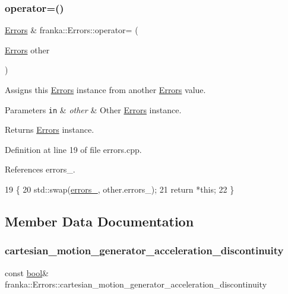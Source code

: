 \subsubsection{\texorpdfstring{operator=()}{operator=()}}
{\footnotesize\ttfamily \hyperlink{structfranka_1_1Errors}{Errors} \& franka\+::\+Errors\+::operator= (\begin{DoxyParamCaption}\item[{\hyperlink{structfranka_1_1Errors}{Errors}}]{other }\end{DoxyParamCaption})}

Assigns this \hyperlink{structfranka_1_1Errors}{Errors} instance from another \hyperlink{structfranka_1_1Errors}{Errors} value.


\begin{DoxyParams}[1]{Parameters}
\mbox{\tt in}  & {\em other} & Other \hyperlink{structfranka_1_1Errors}{Errors} instance.\\
\hline
\end{DoxyParams}
\begin{DoxyReturn}{Returns}
\hyperlink{structfranka_1_1Errors}{Errors} instance. 
\end{DoxyReturn}


Definition at line 19 of file errors.\+cpp.



References errors\+\_\+.


\begin{DoxyCode}
19                                       \{
20   std::swap(\hyperlink{structfranka_1_1Errors_ab269bb0ad30eb1aaa7009a246be8e8aa}{errors\_}, other.errors\_);
21   \textcolor{keywordflow}{return} *\textcolor{keyword}{this};
22 \}
\end{DoxyCode}


\subsection{Member Data Documentation}
\mbox{\label{structfranka_1_1Errors_a10c6ac36bf48b4a9edf91e74d9bc4837}} 
\subsubsection{\texorpdfstring{cartesian\+\_\+motion\+\_\+generator\+\_\+acceleration\+\_\+discontinuity}{cartesian\_motion\_generator\_acceleration\_discontinuity}}
{\footnotesize\ttfamily const \hyperlink{classbool}{bool}\& franka\+::\+Errors\+::cartesian\+\_\+motion\+\_\+generator\+\_\+acceleration\+\_\+discontinuity}

